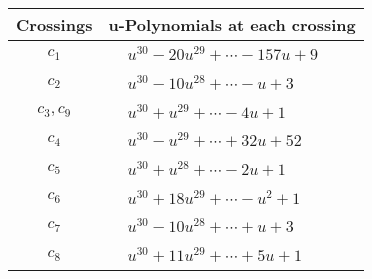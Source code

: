 \documentclass[1p]{elsarticle_modified}
\theoremstyle{definition}
\begin{document}
\begin{tabular}{m{50pt}|m{274pt}}
Crossings & \hspace{64pt}u-Polynomials at each crossing \\
\hline $$\begin{aligned}c_{1}\end{aligned}$$&$\begin{aligned}
&u^{30}-20 u^{29}+\cdots-157 u+9
\end{aligned}$\\
\hline $$\begin{aligned}c_{2}\end{aligned}$$&$\begin{aligned}
&u^{30}-10 u^{28}+\cdots- u+3
\end{aligned}$\\
\hline $$\begin{aligned}c_{3},c_{9}\end{aligned}$$&$\begin{aligned}
&u^{30}+u^{29}+\cdots-4 u+1
\end{aligned}$\\
\hline $$\begin{aligned}c_{4}\end{aligned}$$&$\begin{aligned}
&u^{30}- u^{29}+\cdots+32 u+52
\end{aligned}$\\
\hline $$\begin{aligned}c_{5}\end{aligned}$$&$\begin{aligned}
&u^{30}+u^{28}+\cdots-2 u+1
\end{aligned}$\\
\hline $$\begin{aligned}c_{6}\end{aligned}$$&$\begin{aligned}
&u^{30}+18 u^{29}+\cdots- u^2+1
\end{aligned}$\\
\hline $$\begin{aligned}c_{7}\end{aligned}$$&$\begin{aligned}
&u^{30}-10 u^{28}+\cdots+u+3
\end{aligned}$\\
\hline $$\begin{aligned}c_{8}\end{aligned}$$&$\begin{aligned}
&u^{30}+11 u^{29}+\cdots+5 u+1
\end{aligned}$\\

\end{tabular}
\end{document}
